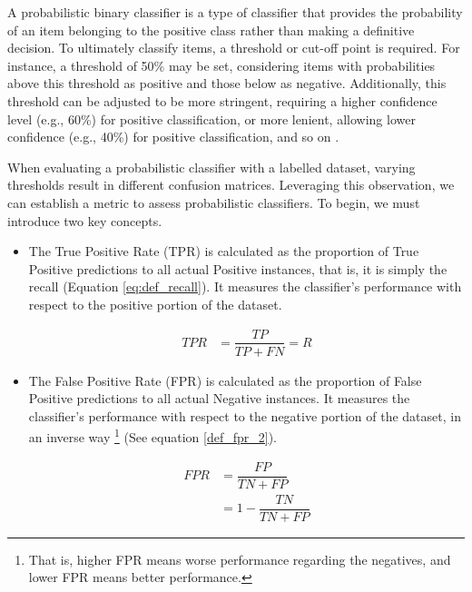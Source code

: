 \label{02_evaluating_probabilistic_classifiers}

A probabilistic binary classifier is a type of classifier that provides the probability of an item belonging to the positive class rather than making a definitive decision. To ultimately classify items, a threshold or cut-off point is required. For instance, a threshold of 50\% may be set, considering items with probabilities above this threshold as positive and those below as negative. Additionally, this threshold can be adjusted to be more stringent, requiring a higher confidence level (e.g., 60\%) for positive classification, or more lenient, allowing lower confidence (e.g., 40\%) for positive classification, and so on .

When evaluating a probabilistic classifier with a labelled dataset, varying thresholds result in different confusion matrices. Leveraging this observation, we can establish a metric to assess probabilistic classifiers. To begin, we must introduce two key concepts.

\begin{itemize}
    \item The True Positive Rate (TPR)  is calculated as the proportion of True Positive predictions to all actual Positive instances, that is, it is simply the recall (Equation \ref{eq:def_recall}). It measures the classifier's performance with respect to the positive portion of the dataset.

    \begin{align}
        TPR &= \dfrac{TP}{TP+FN} =R \label{def_tpr} 
    \end{align}
    
    \item The False Positive Rate (FPR) is calculated as the proportion of False Positive predictions to all actual Negative instances. It measures the classifier's performance with respect to the negative portion of the dataset, in an inverse way \footnote{That is, higher FPR means worse performance regarding the negatives, and lower FPR means better performance.} (See equation \ref{def_fpr_2}).
    
    \begin{align}
        FPR &= \dfrac{FP}{TN+FP} \label{def_fpr} \\
            &= 1 - \dfrac{TN}{TN+FP} \label{def_fpr_2}
    \end{align}
    
\end{itemize}


